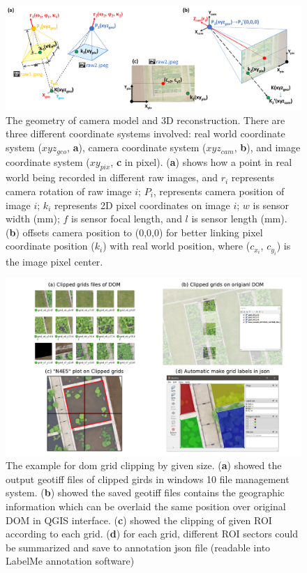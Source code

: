 \documentclass{configs/bmcart}
\begin{document}
\begin{backmatter}
\begin{figure}[!htb]
  \includegraphics[width=0.95\linewidth]{figures/raw2raw.pdf}
  \caption{The geometry of camera model and 3D reconstruction. There are three different coordinate systems involved: real world coordinate system ($xyz_{geo}$, \textbf{a}), camera coordinate system ($xyz_{cam}$, \textbf{b}), and image coordinate system ($xy_{pix}$, \textbf{c} in pixel). (\textbf{a}) shows how a point in real world being recorded in different raw images, and $r_i$ represents camera rotation of raw image $i$; $P_i$, represents camera position of image $i$; $k_i$ represents 2D pixel coordinates on image $i$; $w$ is sensor width (mm); $f$ is sensor focal length, and $l$ is sensor length (mm). (\textbf{b}) offsets camera position to (0,0,0) for better linking pixel coordinate position ($k_i$) with real world position, where ($c_{x_i}$, $c_{y_i}$) is the image pixel center.}
  \label{fig:geom}
\end{figure}

\begin{figure}[!htb]
  \includegraphics[width=0.95\linewidth]{figures/dom2grids.pdf}
  \caption{The example for \acrfull*{dom} grid clipping by given size. (\textbf{a}) showed the output geotiff files of clipped girds in windows 10 file management system. (\textbf{b}) showed the saved geotiff files contains the geographic information which can be overlaid the same position over original DOM in QGIS interface. (\textbf{c}) showed the clipping of given ROI according to each grid. (\textbf{d}) for each grid, different ROI sectors could be summarized and save to annotation json file (readable into LabelMe annotation software)}
  \label{fig:dom2girds}
\end{figure}


\end{backmatter}
\end{document}
